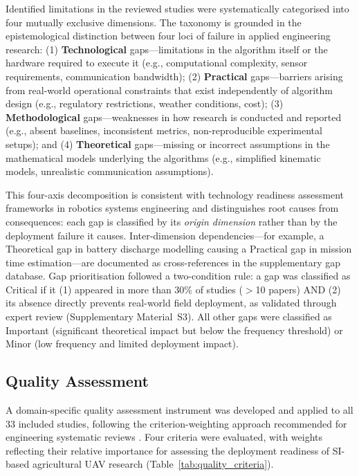 \documentclass[review,3p,times]{elsarticle}
\begin{document}
Identified limitations in the reviewed studies were systematically categorised into four mutually exclusive dimensions. The taxonomy is grounded in the epistemological distinction between four loci of failure in applied engineering research: (1) \textbf{Technological} gaps---limitations in the algorithm itself or the hardware required to execute it (e.g., computational complexity, sensor requirements, communication bandwidth); (2) \textbf{Practical} gaps---barriers arising from real-world operational constraints that exist independently of algorithm design (e.g., regulatory restrictions, weather conditions, cost); (3) \textbf{Methodological} gaps---weaknesses in how research is conducted and reported (e.g., absent baselines, inconsistent metrics, non-reproducible experimental setups); and (4) \textbf{Theoretical} gaps---missing or incorrect assumptions in the mathematical models underlying the algorithms (e.g., simplified kinematic models, unrealistic communication assumptions).

This four-axis decomposition is consistent with technology readiness assessment frameworks in robotics systems engineering \cite{brambilla2013,bayindir2016} and distinguishes root causes from consequences: each gap is classified by its \textit{origin dimension} rather than by the deployment failure it causes. Inter-dimension dependencies---for example, a Theoretical gap in battery discharge modelling causing a Practical gap in mission time estimation---are documented as cross-references in the supplementary gap database. Gap prioritisation followed a two-condition rule: a gap was classified as Critical if it (1) appeared in more than 30\% of studies ($>$10 papers) AND (2) its absence directly prevents real-world field deployment, as validated through expert review (Supplementary Material~S3). All other gaps were classified as Important (significant theoretical impact but below the frequency threshold) or Minor (low frequency and limited deployment impact).

\subsection{Quality Assessment}

A domain-specific quality assessment instrument was developed and applied to all 33 included studies, following the criterion-weighting approach recommended for engineering systematic reviews \cite{brambilla2013}. Four criteria were evaluated, with weights reflecting their relative importance for assessing the deployment readiness of SI-based agricultural UAV research (Table~\ref{tab:quality_criteria}).
\end{document}
